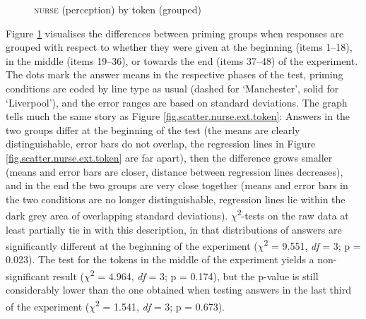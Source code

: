 \begin{figure}[h]
	\centering
		\resizebox{.49\linewidth}{!}{} 
	\caption{\textsc{nurse} (perception) by token (grouped)}
	\label{fig.line.nurse.ext.token}
\end{figure}

Figure \ref{fig.line.nurse.ext.token} visualises the differences between priming groups when responses are grouped with respect to whether they were given at the beginning (items 1--18), in the middle (items 19--36), or towards the end (items 37--48) of the experiment.
The dots mark the answer means in the respective phases of the test, priming conditions are coded by line type as usual (dashed for `Manchester', solid for `Liverpool'), and the error ranges are based on standard deviations.
The graph tells much the same story as Figure \ref{fig.scatter.nurse.ext.token}: Answers in the two groups differ at the beginning of the test (the means are clearly distinguishable, error bars do not overlap, the regression lines in Figure \ref{fig.scatter.nurse.ext.token} are far apart), then the difference grows smaller (means and error bars are closer, distance between regression lines decreases), and in the end the two groups are very close together (means and error bars in the two conditions are no longer distinguishable, regression lines lie within the dark grey area of overlapping standard deviations).
\(\chi\)\textsuperscript{2}-tests on the raw data at least partially tie in with this description, in that distributions of answers are significantly different at the beginning of the experiment (\(\chi\)\textsuperscript{2} = 9.551, \emph{df} = 3; p = 0.023).
The test for the tokens in the middle of the experiment yields a non-significant result (\(\chi\)\textsuperscript{2} = 4.964, \emph{df} = 3; p = 0.174), but the p-value is still considerably lower than the one obtained when testing answers in the last third of the experiment (\(\chi\)\textsuperscript{2} = 1.541, \emph{df} = 3; p = 0.673).

